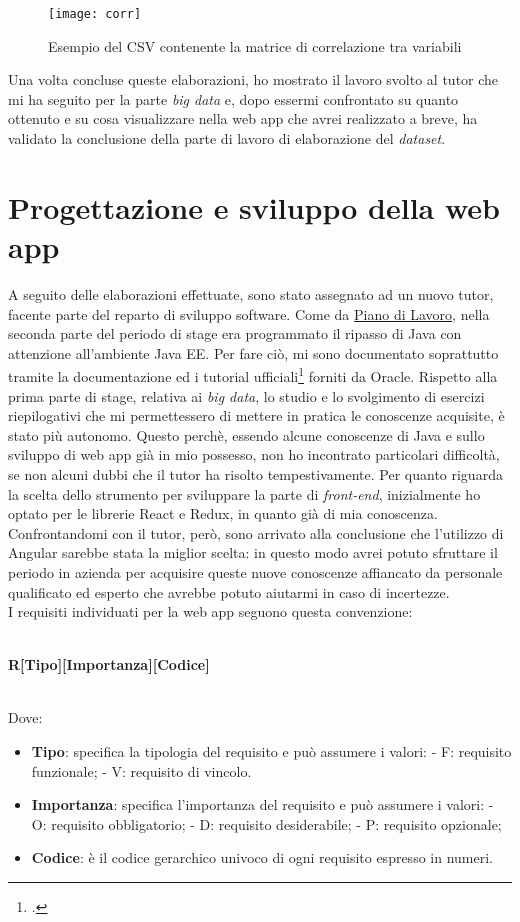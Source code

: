 \begin{figure}[!h]
	\centering
	\texttt{[image: corr]}
	\caption{Esempio del CSV contenente la matrice di correlazione tra variabili}
\end{figure}

Una volta concluse queste elaborazioni, ho mostrato il lavoro svolto al tutor che mi ha seguito per la parte \textit{big data} e, dopo essermi confrontato su quanto ottenuto e su cosa visualizzare nella \gls{web app} che avrei realizzato a breve, ha validato la conclusione della parte di lavoro di elaborazione del \textit{dataset}.

\clearpage
\section{Progettazione e sviluppo della web app}
A seguito delle elaborazioni effettuate, sono stato assegnato ad un nuovo tutor, facente parte del reparto di sviluppo software. Come da \hyperref[pdl]{Piano di Lavoro}, nella seconda parte del periodo di stage era programmato il ripasso di Java con attenzione all'ambiente Java EE. Per fare ciò, mi sono documentato soprattutto tramite la documentazione ed i tutorial ufficiali\footcite{https://docs.oracle.com/javaee/7/tutorial/index.html} forniti da Oracle. Rispetto alla prima parte di stage, relativa ai \textit{big data}, lo studio e lo svolgimento di esercizi riepilogativi che mi permettessero di mettere in pratica le conoscenze acquisite, è stato più autonomo. Questo perchè, essendo alcune conoscenze di Java e sullo sviluppo di \gls{web app} già in mio possesso, non ho incontrato particolari difficoltà, se non alcuni dubbi che il tutor ha risolto tempestivamente.
Per quanto riguarda la scelta dello strumento per sviluppare la parte di \textit{front-end}, inizialmente ho optato per le librerie React e Redux, in quanto già di mia conoscenza. Confrontandomi con il tutor, però, sono arrivato alla conclusione che l'utilizzo di Angular sarebbe stata la miglior scelta: in questo modo avrei potuto sfruttare il periodo in azienda per acquisire queste nuove conoscenze affiancato da personale qualificato ed esperto che avrebbe potuto aiutarmi in caso di incertezze. \\
I requisiti individuati per la \gls{web app} seguono questa convenzione:\\\\
\centerline{\textbf{R[Tipo][Importanza][Codice]}}\\
Dove:
\begin{itemize}
	\item \textbf{Tipo}: specifica la tipologia del requisito e può assumere i valori:
	\subitem - F: requisito funzionale;
	\subitem - V: requisito di vincolo.
	\item \textbf{Importanza}: specifica l'importanza del requisito e può assumere i valori:
	\subitem - O: requisito obbligatorio;
	\subitem - D: requisito desiderabile;
	\subitem - P: requisito opzionale; 
	\item  \textbf{Codice}: è il codice gerarchico univoco di ogni requisito espresso in numeri.
\end{itemize} 

